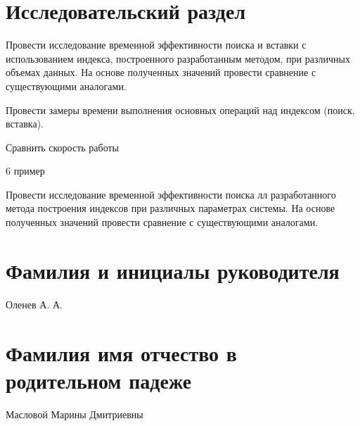 \documentclass{bmstu}
\begin{document}
\section*{Исследовательский раздел}

Провести исследование временной эффективности поиска и вставки с использованием
индекса, построенного разработанным методом, при различных объемах данных. На
основе полученных значений провести сравнение с существующими аналогами.

Провести замеры времени выполнения основных операций над индексом (поиск,
вставка).

Сравнить скорость работы 

6 пример

Провести исследование временной эффективности поиска лл разработанного метода
построения индексов при различных параметрах системы. На основе полученных
значений провести сравнение с существующими аналогами.

\section*{Фамилия и инициалы руководителя}

Оленев А. А.

\section*{Фамилия имя отчество в родительном падеже}

Масловой Марины Дмитриевны
\end{document}
